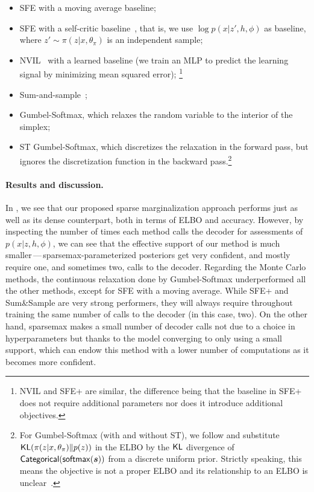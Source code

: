 \begin{itemize}
    \item SFE with a moving average baseline;
    \item SFE with a self-critic
          baseline~\citep[SFE+;][]{rennie2017self}, that is, we use $\log
              p(x|z', h, \phi)$ as baseline, where $z' \sim \pi(z|x, \theta_\pi)$
          is an independent sample;
    \item NVIL~\citep{mnih2014neural}
          with a learned baseline (we train an MLP to predict the learning
          signal by minimizing mean squared error);
          \footnote{NVIL and SFE+ are
              similar, the difference being that the baseline in SFE+ does not
              require additional parameters nor does it introduce additional
              objectives.}
    \item Sum-and-sample~\citep{RB19};
    \item Gumbel-Softmax, which relaxes the random variable to the interior of the simplex;
    \item ST Gumbel-Softmax, which discretizes the relaxation in
          the forward pass, but ignores the discretization function in the
          backward pass.\footnote{For Gumbel-Softmax (with and
              without ST), we follow \citet{GumbelSoftmax} and substitute
              $\operatorname{\mathsf{KL}}(\pi(z|x, \theta_\pi) \| p(z))$ in the ELBO by the $\operatorname{\mathsf{KL}}$
              divergence of $\operatorname{\mathsf{Categorical}}(\operatorname*{\mathsf{softmax}}(\bm{s}))$ from a discrete uniform prior.
              Strictly speaking, this means the objective is not a proper ELBO and
              its relationship to an ELBO is unclear~\citep[Appendix
                  C.2]{Concrete}.}
\end{itemize}

\paragraph*{Results and discussion.}
In , we see that our proposed sparse
marginalization approach performs just as well as its dense
counterpart, both in terms of ELBO and accuracy. However, by
inspecting the number of times each method calls the decoder for
assessments of $p(x|z, h,\phi)$, we can see that the effective
support of our method is much smaller\,---\,sparsemax-parameterized
posteriors get very confident, and mostly require one, and sometimes
two, calls to the decoder. Regarding the Monte Carlo methods, the
continuous relaxation done by Gumbel-Softmax underperformed all the
other methods, except for SFE with a moving average. While
SFE+ and Sum\&Sample are very strong performers, they will always
require throughout training the same number of calls to the decoder
(in this case, two). On the other hand, sparsemax makes a small
number of decoder calls not due to a choice in hyperparameters but
thanks to the model converging to only using a small support, which
can endow this method with a lower number of computations as it
becomes more confident.

